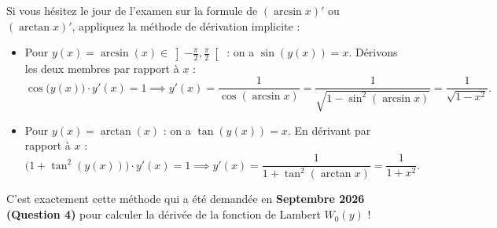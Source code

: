 \begin{astuce}
Si vous hésitez le jour de l'examen sur la formule de $(\arcsin x)'$ ou $(\arctan x)'$, appliquez la méthode de dérivation implicite :
\begin{itemize}
    \item Pour $y(x) = \arcsin(x) \in \left]-\frac{\pi}{2}, \frac{\pi}{2}\right[$ : on a $\sin(y(x)) = x$. Dérivons les deux membres par rapport à $x$ :
    \[
        \cos\bigl(y(x)\bigr) \cdot y'(x) = 1 \implies y'(x) = \frac{1}{\cos(\arcsin x)} = \frac{1}{\sqrt{1 - \sin^2(\arcsin x)}} = \frac{1}{\sqrt{1 - x^2}}.
    \]
    \item Pour $y(x) = \arctan(x)$ : on a $\tan(y(x)) = x$. En dérivant par rapport à $x$ :
    \[
        \bigl(1 + \tan^2(y(x))\bigr)\cdot y'(x) = 1 \implies y'(x) = \frac{1}{1 + \tan^2(\arctan x)} = \frac{1}{1 + x^2}.
    \]
\end{itemize}
C'est exactement cette méthode qui a été demandée en \textbf{Septembre 2026 (Question 4)} pour calculer la dérivée de la fonction de Lambert $W_0(y)$ !
\end{astuce}

